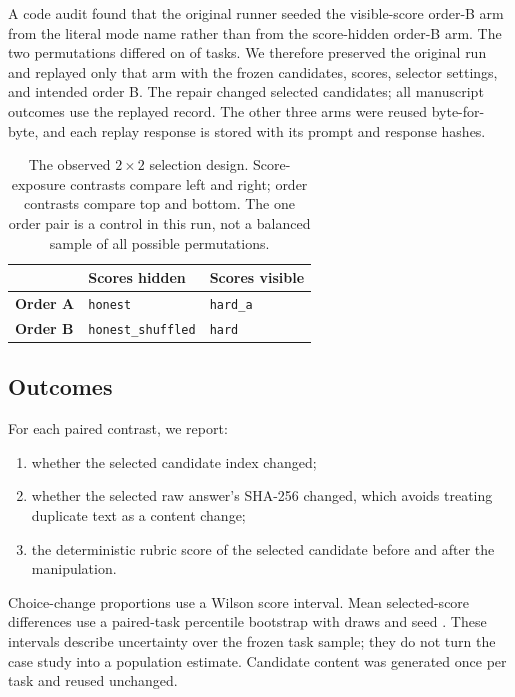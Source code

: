 \documentclass[11pt]{article}
\begin{document}
A code audit found that the original runner seeded the visible-score order-B arm from the literal
mode name rather than from the score-hidden order-B arm. The two permutations differed on
\OriginalHardOrderMismatchTasks{} of \DesignTasks{} tasks. We therefore preserved the original run and
replayed only that arm with the frozen candidates, scores, selector settings, and intended order B.
The repair changed \HardRepairPickChangedTasks{} selected candidates; all manuscript outcomes use the
replayed record. The other three arms were reused byte-for-byte, and each replay response is stored
with its prompt and response hashes.

\begin{table}[H]
\centering
\small
\begin{tabular}{@{}lll@{}}
\toprule
 & \textbf{Scores hidden} & \textbf{Scores visible} \\
\midrule
\textbf{Order A} & \texttt{honest} & \texttt{hard\_a} \\
\textbf{Order B} & \texttt{honest\_shuffled} & \texttt{hard} \\
\bottomrule
\end{tabular}
\caption{The observed \(2\times2\) selection design. Score-exposure contrasts compare left and right;
order contrasts compare top and bottom. The one order pair is a control in this run, not a balanced
sample of all possible permutations.}
\label{tab:design}
\end{table}

\subsection{Outcomes}

For each paired contrast, we report:
\begin{enumerate}
\item whether the selected candidate index changed;
\item whether the selected raw answer's SHA-256 changed, which avoids treating duplicate text as a
content change;
\item the deterministic rubric score of the selected candidate before and after the manipulation.
\end{enumerate}

Choice-change proportions use a Wilson score interval. Mean selected-score differences use a
paired-task percentile bootstrap with \BootstrapDraws{} draws and seed \BootstrapSeed. These intervals
describe uncertainty over the frozen task sample; they do not turn the case study into a population
estimate. Candidate content was generated once per task and reused unchanged.
\end{document}
